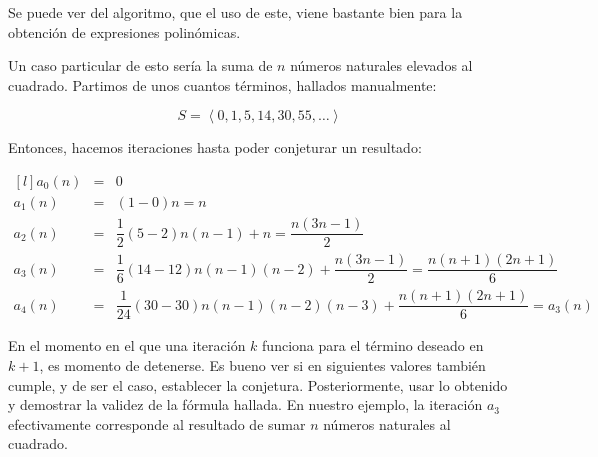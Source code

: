 Se puede ver del algoritmo, que el uso de este, viene bastante
bien para la obtención de expresiones polinómicas.

Un caso particular de esto sería la suma de $n$ números naturales elevados
al cuadrado. Partimos de unos cuantos términos, hallados manualmente:

\[S = \left<0, 1, 5, 14, 30, 55, \dots \right>\]

Entonces, hacemos iteraciones hasta poder conjeturar un resultado:

\[
    \begin{matrix*}[l]
        a_0(n) &=& 0\\
        a_1(n) &=& (1-0)n = n\\
        a_2(n) &=& \dfrac{1}{2}(5 - 2)n(n-1) + n = \dfrac{n(3n - 1)}{2}\\
        a_3(n) &=& \dfrac{1}{6}(14 - 12)n(n-1)(n-2) + \dfrac{n(3n - 1)}{2} 
        = \dfrac{n(n+1)(2n+1)}{6}\\
        a_4(n) &=& \dfrac{1}{24}(30 - 30)n(n-1)(n-2)(n-3) + \dfrac{n(n+1)(2n+1)}{6}
        = a_3(n)
    \end{matrix*}
\]

En el momento en el que una iteración $k$ funciona para el término deseado en $k+1$,
es momento de detenerse. Es bueno ver si en siguientes valores también cumple, y de ser
el caso, establecer la conjetura. Posteriormente, usar lo obtenido y demostrar la validez
de la fórmula hallada. En nuestro ejemplo, la iteración $a_3$ efectivamente corresponde
al resultado de sumar $n$ números naturales al cuadrado.
